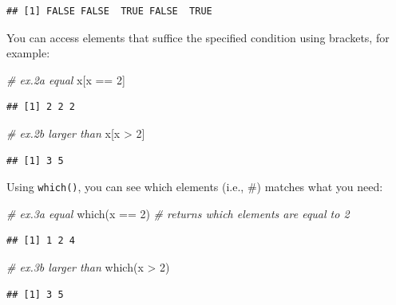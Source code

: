 \documentclass[
]{book}
\newenvironment{Shaded}{\begin{snugshade}}{\end{snugshade}}
\newcommand{\CommentTok}[1]{\textcolor[rgb]{0.56,0.35,0.01}{\textit{#1}}}
\newcommand{\DecValTok}[1]{\textcolor[rgb]{0.00,0.00,0.81}{#1}}
\newcommand{\FunctionTok}[1]{\textcolor[rgb]{0.00,0.00,0.00}{#1}}
\newcommand{\NormalTok}[1]{#1}
\newcommand{\SpecialCharTok}[1]{\textcolor[rgb]{0.00,0.00,0.00}{#1}}
\begin{document}
\begin{verbatim}
## [1] FALSE FALSE  TRUE FALSE  TRUE
\end{verbatim}

You can access elements that suffice the specified condition using brackets, for example:

\begin{Shaded}
\begin{Highlighting}[]
\CommentTok{\# ex.2a equal}
\NormalTok{x[x }\SpecialCharTok{==} \DecValTok{2}\NormalTok{]}
\end{Highlighting}
\end{Shaded}

\begin{verbatim}
## [1] 2 2 2
\end{verbatim}

\begin{Shaded}
\begin{Highlighting}[]
\CommentTok{\# ex.2b larger than}
\NormalTok{x[x }\SpecialCharTok{\textgreater{}} \DecValTok{2}\NormalTok{]}
\end{Highlighting}
\end{Shaded}

\begin{verbatim}
## [1] 3 5
\end{verbatim}

Using \texttt{which()}, you can see which elements (i.e., \#) matches what you need:

\begin{Shaded}
\begin{Highlighting}[]
\CommentTok{\# ex.3a equal}
\FunctionTok{which}\NormalTok{(x }\SpecialCharTok{==} \DecValTok{2}\NormalTok{) }\CommentTok{\# returns which elements are equal to 2}
\end{Highlighting}
\end{Shaded}

\begin{verbatim}
## [1] 1 2 4
\end{verbatim}

\begin{Shaded}
\begin{Highlighting}[]
\CommentTok{\# ex.3b larger than}
\FunctionTok{which}\NormalTok{(x }\SpecialCharTok{\textgreater{}} \DecValTok{2}\NormalTok{)}
\end{Highlighting}
\end{Shaded}

\begin{verbatim}
## [1] 3 5
\end{verbatim}
\end{document}
